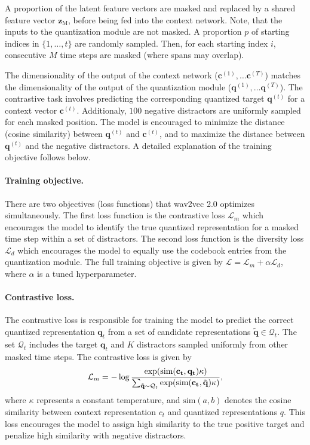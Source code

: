 A proportion of the latent feature vectors are masked and replaced by a shared feature vector $\mathbf{z}_{\text{M}}$, before being fed into the context network.
Note, that the inputs to the quantization module are not masked.
A proportion $p$ of starting indices in $\{1, \dots, t\}$ are randomly sampled. 
Then, for each starting index $i$, consecutive $M$ time steps are masked (where spans may overlap).

The dimensionality of the output of the context network ($\mathbf{c}^{(1)}, \dots \mathbf{c}^{(T)}$) matches the dimensionality of the 
output of the quantization module ($\mathbf{q}^{(1)}, \dots \mathbf{q}^{(T)}$).
The contrastive task involves predicting the corresponding quantized target $\mathbf{q}^{(t)}$ for a context vector $\mathbf{c}^{(t)}$.
Additionaly, $100$ negative distractors are uniformly sampled for each masked position.
The model is encouraged to minimize the distance (cosine similarity) between $\mathbf{q}^{(t)}$ and $\mathbf{c}^{(t)}$, and to maximize the distance between $\mathbf{q}^{(t)}$ and the negative distractors.
A detailed explanation of the training objective follows below.

\paragraph*{Training objective.} There are two objectives (loss functions) that wav2vec 2.0 optimizes simultaneously.
The first loss function is the contrastive loss $\mathcal{L}_m$ which encourages the model to
identify the true quantized representation for a masked time step within a set of distractors. 
The second loss function is the diversity loss $\mathcal{L}_d$ which encourages the model 
to equally use the codebook entries from the quantization module.
The full training objective is given by $\mathcal{L} = \mathcal{L}_m + \alpha \mathcal{L}_d$, where $\alpha$ is a tuned hyperparameter.

\paragraph*{Contrastive loss.}
The contrastive loss is responsible for training the model to predict the correct quantized 
representation $\mathbf{q}_t$ from a set of candidate representations $\mathbf{\tilde{q}} \in \mathcal{Q}_t$. 
The set $\mathcal{Q}_t$ includes the target $\mathbf{q}_t$ and $K$ distractors sampled uniformly from other masked time steps. 
The contrastive loss is given by
\begin{equation}
    \mathcal{L}_m = -\log \dfrac{\exp(\text{sim}(\mathbf{c_t}, \mathbf{q_t}) \/ \kappa)}{\sum_{\mathbf{\tilde{q}} \sim \mathcal{Q}_t} \exp(\text{sim}(\mathbf{c_t}, \mathbf{\tilde{q}}) \/ \kappa)},
\end{equation}
where $\kappa$ represents a constant temperature, and $\text{sim}(a, b)$ denotes the cosine similarity between 
context representation $c_t$ and quantized representations $q$. 
This loss encourages the model to assign high similarity to the true 
positive target and penalize high similarity with negative distractors.

